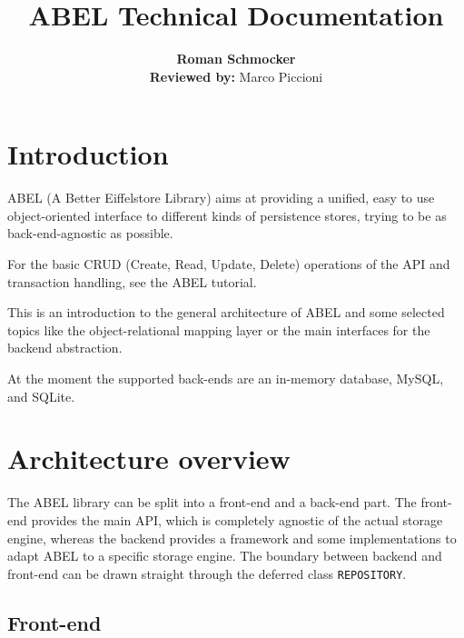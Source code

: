 \documentclass[a4paper,12pt]{report}
\title {ABEL Technical Documentation}
\author {
	\textbf{Roman Schmocker} \\
	\textbf{Reviewed by:} Marco Piccioni
}
\begin{document}
\maketitle


%


\tableofcontents



\chapter{Introduction}
ABEL (A Better Eiffelstore Library) aims at providing a unified, easy to use object-oriented interface to different kinds of persistence stores, trying to be as back-end-agnostic as possible.

For the basic CRUD (Create, Read, Update, Delete) operations of the API and transaction handling, see the ABEL tutorial. 

This is an introduction to the general architecture of ABEL and some selected topics like the object-relational mapping layer or the main interfaces for the backend abstraction.

At the moment the supported back-ends are an in-memory database, MySQL, and SQLite. 
 
\chapter{Architecture overview}

The ABEL library can be split into a front-end and a back-end part.
The front-end provides the main API, which is completely agnostic of the actual storage engine, 
whereas the backend provides a framework and some implementations to adapt ABEL to a specific storage engine.
The boundary between backend and front-end can be drawn straight through the deferred class \lstinline!REPOSITORY!.

\section{Front-end}
\end{document}
